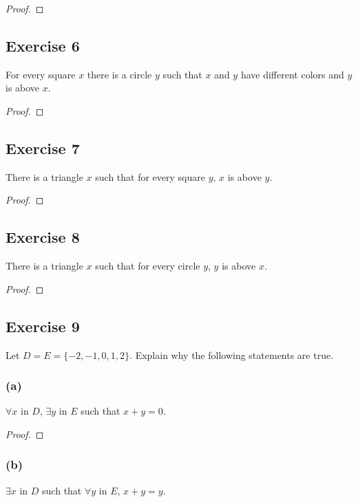 \documentclass[14pt]{extarticle}
\newcommand{\fa}{\forall}
\newcommand{\te}{\exists}
\begin{document}
\begin{proof}

\end{proof}

\subsection{Exercise 6}
For every square $x$ there is a circle $y$ such that $x$ and $y$ have different colors and $y$ is above $x$.

\begin{proof}

\end{proof}

\subsection{Exercise 7}
There is a triangle $x$ such that for every square $y$, $x$ is above $y$.

\begin{proof}

\end{proof}

\subsection{Exercise 8}
There is a triangle $x$ such that for every circle $y$, $y$ is above $x$.

\begin{proof}

\end{proof}

\subsection{Exercise 9}
Let $D = E = \{-2, -1, 0, 1, 2\}$. Explain why the following statements are true.

\subsubsection{(a)}
$\fa x$ in $D$, $\te y$ in $E$ such that $x + y = 0$.

\begin{proof}

\end{proof}

\subsubsection{(b)}
$\te x$ in $D$ such that $\fa y$ in $E$, $x + y = y$.
\end{document}
